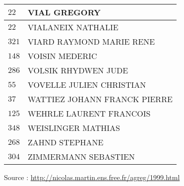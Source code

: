 \begin{xltabular}{\linewidth}{|l|X|}
    \hline
    $22$ & VIAL GREGORY \\
    \hline
    $22$ & VIALANEIX NATHALIE \\
    \hline
    $321$ & VIARD RAYMOND MARIE RENE \\
    \hline
    $148$ & VOISIN MEDERIC \\
    \hline
    $286$ & VOLSIK RHYDWEN JUDE \\
    \hline
    $55$ & VOVELLE JULIEN CHRISTIAN \\
    \hline
    $37$ & WATTIEZ JOHANN FRANCK PIERRE \\
    \hline
    $125$ & WEHRLE LAURENT FRANCOIS \\
    \hline
    $348$ & WEISLINGER MATHIAS \\
    \hline
    $268$ & ZAHND STEPHANE \\
    \hline
    $304$ & ZIMMERMANN SEBASTIEN \\
    \hline
  \end{xltabular}

  \begin{flushright}
    {\tiny Source : \url{http://nicolas.martin.ens.free.fr/agreg/1999.html}}
  \end{flushright}

